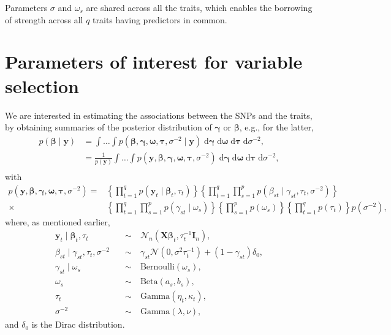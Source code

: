 \documentclass[a4paper, 11pt]{report}
\numberwithin{equation}{chapter}
\begin{document}
Parameters $\sigma$ and $\omega_s$ are shared across all the traits, which enables the borrowing of strength across all $q$ traits having predictors in common. 

\section{Parameters of interest for variable selection}

We are interested in estimating the associations between the SNPs and the traits, by obtaining summaries of the posterior distribution of $\boldsymbol{\gamma}$ or $\boldsymbol{\beta}$, e.g., for the latter,
\begin{align*}
p(\boldsymbol{\beta}\mid\boldsymbol{y})&=\int\dots\int p(\boldsymbol{\beta},\boldsymbol{\gamma},\boldsymbol{\omega},\boldsymbol{\tau},\sigma^{-2}\mid\boldsymbol{y})\;\mathrm{d}\boldsymbol{\gamma}\;\mathrm{d}\boldsymbol{\omega}\;\mathrm{d}\boldsymbol{\tau}\;\mathrm{d}\sigma^{-2},\\
&=\frac{1}{p(\boldsymbol{y})}\int\dots\int p(\boldsymbol{y},\boldsymbol{\beta},\boldsymbol{\gamma},\boldsymbol{\omega},\boldsymbol{\tau},\sigma^{-2})\;\mathrm{d}\boldsymbol{\gamma}\;\mathrm{d}\boldsymbol{\omega}\;\mathrm{d}\boldsymbol{\tau}\;\mathrm{d}\sigma^{-2},\\
\end{align*}
with 
\begin{align*}
p(\boldsymbol{y},\boldsymbol{\beta},\boldsymbol{\gamma},\boldsymbol{\omega},\boldsymbol{\tau},\sigma^{-2}) = &\left\lbrace\prod_{t=1}^qp(\boldsymbol{y}_t \mid \boldsymbol{\beta}_t,\tau_t)\right\rbrace\left\lbrace\prod_{t=1}^q\prod_{s=1}^p p(\beta_{st} \mid \gamma_{st},\tau_t,\sigma^{-2})\right\rbrace\\
\times &\left\lbrace \prod_{t=1}^q\prod_{s=1}^p p(\gamma_{st} \mid \omega_s)\right\rbrace\left\lbrace \prod_{s=1}^p p(\omega_s)\right\rbrace\left\lbrace\prod_{t=1}^q p(\tau_t)\right\rbrace p(\sigma^{-2}),
\end{align*}
where, as mentioned earlier,
\begin{align*}
\boldsymbol{y}_t \mid \boldsymbol{\beta}_t,\tau_t \quad &\sim \quad \mathcal{N}_n\left(\boldsymbol{X}\boldsymbol{\beta}_t,\tau_t^{-1}\boldsymbol{I}_n\right),\\
\beta_{st} \mid \gamma_{st},\tau_t,\sigma^{-2} \quad &\sim \quad \gamma_{st}\mathcal{N}\left(0,\sigma^2\tau_t^{-1}\right)+(1-\gamma_{st})\delta_0,\\
\gamma_{st} \mid \omega_s \quad &\sim \quad \mathrm{Bernoulli}(\omega_s),\\
\omega_s \quad &\sim \quad \mathrm{Beta}(a_s,b_s),\\
\tau_t \quad &\sim \quad \mathrm{Gamma}(\eta_t,\kappa_t),\\
\sigma^{-2} \quad &\sim \quad \mathrm{Gamma}(\lambda, \nu),
\end{align*}
and $\delta_0$ is the Dirac distribution.
\newpage
\end{document}
